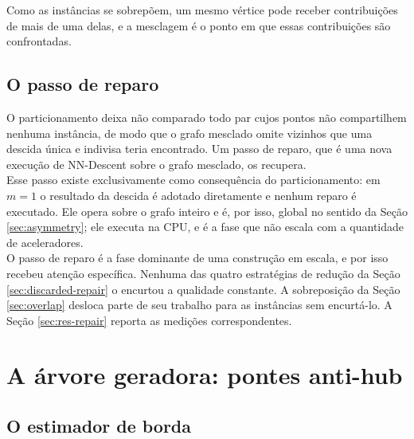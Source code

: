 Como as instâncias se sobrepõem, um mesmo vértice pode receber contribuições de mais de uma delas, e a mesclagem é o ponto em que essas contribuições são confrontadas.\\

\subsection{O passo de reparo\label{sec:repair-pass}}

O particionamento deixa não comparado todo par cujos pontos não compartilhem nenhuma instância, de modo que o grafo mesclado omite vizinhos que uma descida única e indivisa teria encontrado. Um passo de reparo, que é uma nova execução de NN-Descent sobre o grafo mesclado, os recupera.\\

Esse passo existe exclusivamente como consequência do particionamento: em $m = 1$ o resultado da descida é adotado diretamente e nenhum reparo é executado. Ele opera sobre o grafo inteiro e é, por isso, global no sentido da Seção \ref{sec:asymmetry}; ele executa na \ac{CPU}, e é a fase que não escala com a quantidade de aceleradores.\\

O passo de reparo é a fase dominante de uma construção em escala, e por isso recebeu atenção específica. Nenhuma das quatro estratégias de redução da Seção \ref{sec:discarded-repair} o encurtou a qualidade constante. A sobreposição da Seção \ref{sec:overlap} desloca parte de seu trabalho para as instâncias sem encurtá-lo. A Seção \ref{sec:res-repair} reporta as medições correspondentes.\\

\section{A árvore geradora: pontes anti-hub\label{sec:bridges}}

\subsection{O estimador de borda\label{sec:score}}

